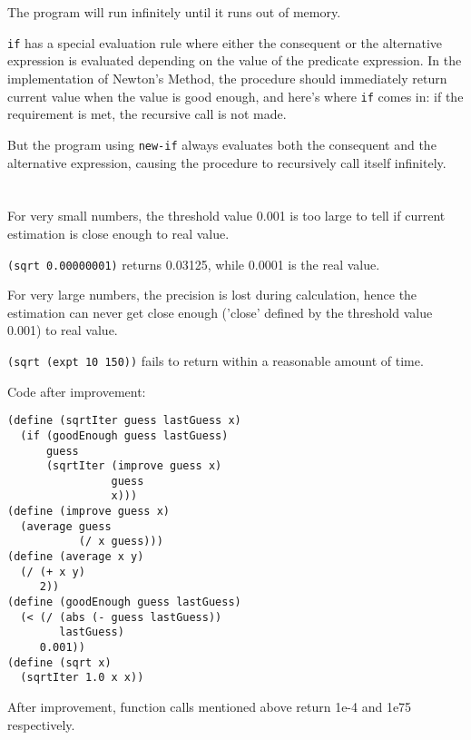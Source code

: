 \documentclass[a4paper]{report}
\begin{document}

\section{}

The program will run infinitely until it runs out of memory.

\lstinline{if} has a special evaluation rule where either the consequent or the alternative expression is evaluated depending on the value of the predicate expression. In the implementation of Newton's Method, the procedure should immediately return current value when the value is good enough, and here's where \lstinline{if} comes in: if the requirement is met, the recursive call is not made.
 
But the program using \lstinline{new-if} always evaluates both the consequent and the alternative expression, causing the procedure to recursively call itself infinitely.


\section{}

For very small numbers, the threshold value 0.001 is too large to tell if current estimation is close enough to real value.

\lstinline{(sqrt 0.00000001)} returns 0.03125, while 0.0001 is the real value.

For very large numbers, the precision is lost during calculation, hence the estimation can never get close enough ('close' defined by the threshold value 0.001) to real value.

\lstinline{(sqrt (expt 10 150))} fails to return within a reasonable amount of time.

Code after improvement:

\begin{lstlisting}
(define (sqrtIter guess lastGuess x)
  (if (goodEnough guess lastGuess)
      guess
      (sqrtIter (improve guess x)
                guess
                x)))
(define (improve guess x)
  (average guess
           (/ x guess)))
(define (average x y)
  (/ (+ x y)
     2))
(define (goodEnough guess lastGuess)
  (< (/ (abs (- guess lastGuess))
        lastGuess)
     0.001))
(define (sqrt x)
  (sqrtIter 1.0 x x))
\end{lstlisting}

After improvement, function calls mentioned above return 1e-4 and 1e75 respectively.
\end{document}
